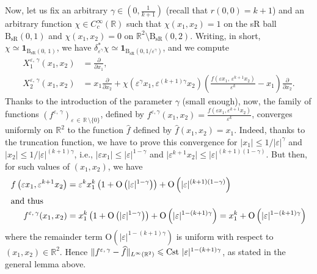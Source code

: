 \documentclass[AHL,Unicode,published]{cedram}
\newcommand*\R{\mathbb{R}}
\newcommand{\rmO}{\mathrm{O}}
\newcommand{\bfun}{\mathbf{1}}
\DeclareMathOperator{\Cst}{Cst}
\newcommand{\BsR}{\mathrm{B}_{\mathrm{sR}}}
\renewcommand{\leq}{\leqslant}
\let\oldhat\hat
\renewcommand*{\hat}[1]{\mathchoice{\widehat{#1}}{\widehat{#1}}{\oldhat{#1}}{\oldhat{#1}}}
\begin{document}
\begin{exem}
Now, let us fix an arbitrary $\gamma\in(0,\frac{1}{k+1})$ (recall that $r(0,0)=k+1$) and an arbitrary function $\chi\in C_c^\infty(\R)$ such that $\chi(x_1,x_2)=1$ on the sR ball $\BsR(0,1)$ and $\chi(x_1,x_2)=0$ on $\R^2\setminus\BsR(0,2)$. Writing, in short, $\chi\simeq \bfun_{\BsR(0,\,1)}$, we have $\delta_{\varepsilon^\gamma}^*\chi\simeq \bfun_{\BsR(0,1/\varepsilon^\gamma)}$, and we compute
\begin{equation*}
\begin{split}
X_1^{\varepsilon,\,\gamma}(x_1,x_2) &= \frac{\partial}{\partial x_1}, \\
X_2^{\varepsilon,\,\gamma}(x_1,x_2) &= x_1\frac{\partial}{\partial x_2} + \chi\left(\varepsilon^\gamma x_1,\varepsilon^{(k+1)\gamma} x_2\right) \left(\frac{f(\varepsilon x_1,\,\varepsilon^{k+1} x_2)}{\varepsilon^k} -x_1 \right)\frac{\partial}{\partial x_2}.
\end{split}
\end{equation*}
Thanks to the introduction of the parameter $\gamma$ (small enough), now, the family of functions $(f^{\varepsilon,\,\gamma})_{\varepsilon\,\in\,\R\,\setminus\{0\}}$, defined by $f^{\varepsilon,\gamma}(x_1,x_2)=\tfrac{f(\varepsilon x_1,\varepsilon^{k+1} x_2)}{\varepsilon^k}$, converges uniformly on $\R^2$ to the function $\widehat f$ defined by $\widehat f(x_1,x_2)=x_1$. Indeed, thanks to the truncation function, we have to prove this convergence for $\vert x_1\vert\leq 1/\vert\varepsilon\vert^\gamma$ and $\vert x_2\vert\leq 1/\vert\varepsilon\vert^{(k+1)\gamma}$, i.e., $\vert \varepsilon x_1\vert\leq \vert\varepsilon\vert^{1-\gamma}$ and $\vert \varepsilon^{k+1} x_2\vert\leq \vert\varepsilon\vert^{(k+1)(1-\gamma)}$. But then, for such values of $(x_1,x_2)$, we have
\begin{align*}
f\left(\varepsilon x_1,\varepsilon^{k+1} x_2\right)&=\varepsilon^k x_1^k\left(1+\rmO\left(\vert\varepsilon\vert^{1-\gamma}\right)\right)+\rmO\left(\vert\varepsilon\vert^{(k+1)(1-\gamma)}\right)
\\
\intertext{and thus}
f^{\varepsilon,\,\gamma}(x_1,x_2)&= x_1^k\left(1+\rmO\left(\vert\varepsilon\vert^{1-\gamma}\right)\right)+\rmO\left(\vert\varepsilon\vert^{1-(k+1)\gamma}\right) = x_1^k+\rmO\left(\vert\varepsilon\vert^{1-(k+1)\gamma}\right)
\end{align*}
where the remainder term $\rmO(\vert\varepsilon\vert^{1-(k+1)\gamma})$ is uniform with respect to $(x_1,x_2)\in\R^2$. Hence $\Vert f^{\varepsilon,\,\gamma}-\hat f\Vert_{L^\infty(\R^2)}\leq \Cst\,\vert\varepsilon\vert^{1-(k+1)\gamma}$, as stated in the general lemma above.
\end{exem}
\end{document}
